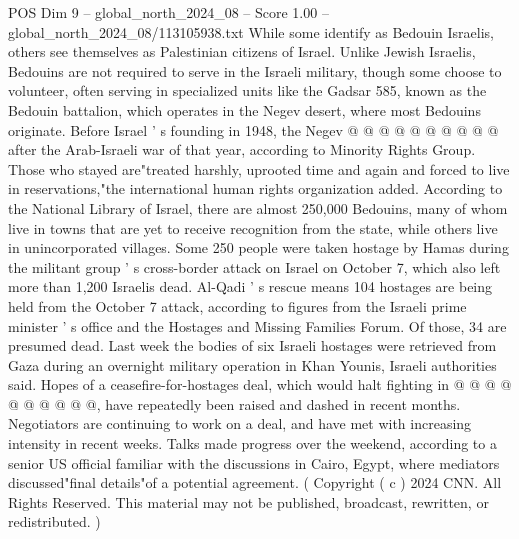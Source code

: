 \begin{textsample}{POS Dim 9 – global\_north\_2024\_08 – Score 1.00 – global\_north\_2024\_08/113105938.txt}
While some identify as Bedouin Israelis, others see themselves as Palestinian citizens of Israel.
Unlike Jewish Israelis, Bedouins are not required to serve in the Israeli military, though some choose to volunteer, often serving in specialized units like the Gadsar 585, known as the Bedouin battalion, which operates in the Negev desert, where most Bedouins originate.
Before Israel ' s founding in 1948, the Negev @ @ @ @ @ @ @ @ @ @ after the Arab-Israeli war of that year, according to Minority Rights Group.
Those who stayed are"treated harshly, uprooted time and again and forced to live in reservations,"the international human rights organization added.
According to the National Library of Israel, there are almost 250,000 Bedouins, many of whom live in towns that are yet to receive recognition from the state, while others live in unincorporated villages.
Some 250 people were taken hostage by Hamas during the militant group ' s cross-border attack on Israel on October 7, which also left more than 1,200 Israelis dead.
Al-Qadi ' s rescue means 104 hostages are being held from the October 7 attack, according to figures from the Israeli prime minister ' s office and the Hostages and Missing Families Forum.
Of those, 34 are presumed dead.
Last week the bodies of six Israeli hostages were retrieved from Gaza during an overnight military operation in Khan Younis, Israeli authorities said.
Hopes of a ceasefire-for-hostages deal, which would halt fighting in @ @ @ @ @ @ @ @ @ @, have repeatedly been raised and dashed in recent months.
Negotiators are continuing to work on a deal, and have met with increasing intensity in recent weeks.
Talks made progress over the weekend, according to a senior US official familiar with the discussions in Cairo, Egypt, where mediators discussed"final details"of a potential agreement. ( Copyright ( c ) 2024 CNN.
All Rights Reserved.
This material may not be published, broadcast, rewritten, or redistributed. )

\end{textsample}
